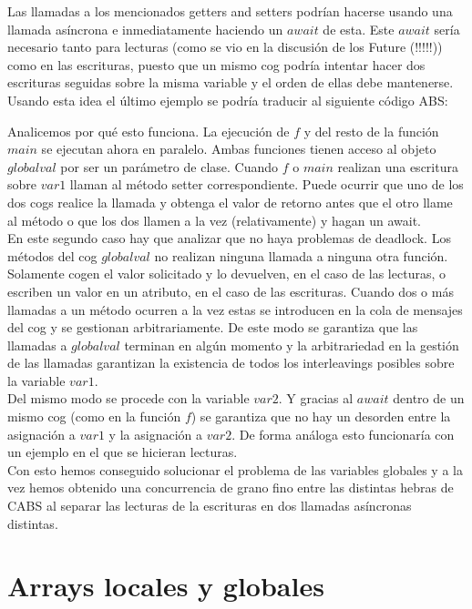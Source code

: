 Las llamadas a los mencionados getters and setters podrían hacerse usando una llamada asíncrona e inmediatamente haciendo un $await$ de esta. Este $await$ sería necesario tanto para lecturas (como se vio en la discusión de los Future (!!!!!)) como en las escrituras, puesto que un mismo cog podría intentar hacer dos escrituras seguidas sobre la misma variable y el orden de ellas debe mantenerse.\\

Usando esta idea el último ejemplo se podría traducir al siguiente código ABS:



Analicemos por qué esto funciona. La ejecución de $f$ y del resto de la función $main$ se ejecutan ahora en paralelo. Ambas funciones tienen acceso al objeto $globalval$ por ser un parámetro de clase. Cuando $f$ o $main$ realizan una escritura sobre $var1$ llaman al método setter correspondiente. Puede ocurrir que uno de los dos cogs realice la llamada y obtenga el valor de retorno antes que el otro llame al método o que los dos llamen a la vez (relativamente) y hagan un await.\\

En este segundo caso hay que analizar que no haya problemas de deadlock. Los métodos del cog $globalval$ no realizan ninguna llamada a ninguna otra función. Solamente cogen el valor solicitado y lo devuelven, en el caso de las lecturas, o escriben un valor en un atributo, en el caso de las escrituras. Cuando dos o más llamadas a un método ocurren a la vez estas se introducen en la cola de mensajes del cog y se gestionan arbitrariamente. De este modo se garantiza que las llamadas a $globalval$ terminan en algún momento y la arbitrariedad en la gestión de las llamadas garantizan la existencia de todos los interleavings posibles sobre la variable $var1$.\\

Del mismo modo se procede con la variable $var2$. Y gracias al $await$ dentro de un mismo cog (como en la función $f$) se garantiza que no hay un desorden entre la asignación a $var1$ y la asignación a $var2$. De forma análoga esto funcionaría con un ejemplo en el que se hicieran lecturas.\\

Con esto hemos conseguido solucionar el problema de las variables globales y a la vez hemos obtenido una concurrencia de grano fino entre las distintas hebras de CABS al separar las lecturas de la escrituras en dos llamadas asíncronas distintas.

\section{Arrays locales y globales}
